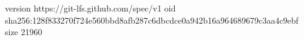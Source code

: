 version https://git-lfs.github.com/spec/v1
oid sha256:128f833270f724e560bbd8afb287c6dbcdce0a942b16a964689679c3aa4c9ebf
size 21960
